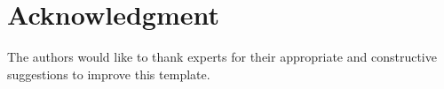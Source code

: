 \section*{Acknowledgment}

The authors would like to thank experts for their appropriate and constructive suggestions to improve this template.
